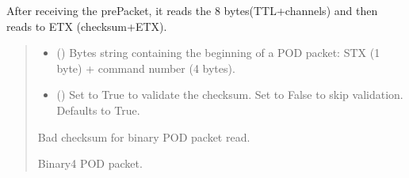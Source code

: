 \documentclass[letterpaper,10pt,english]{sphinxmanual}
\begin{document}
\begin{fulllineitems}
\begin{fulllineitems}
\begin{quote}
\begin{description}
\end{description}\end{quote}

\end{fulllineitems}


\begin{fulllineitems}
\label{\detokenize{Morelia.Devices:Morelia.Devices.PodDevice_8206HR.Pod8206HR._Read_Binary}}
\pysigstartsignatures
{}
\pysigstopsignatures
\sphinxAtStartPar
After receiving the prePacket, it reads the 8 bytes(TTL+channels) and then reads to ETX         (checksum+ETX).
\begin{quote}\begin{description}
\begin{itemize}
\item {} 
\sphinxAtStartPar
{} () \textendash{} Bytes string containing the beginning of a POD packet: STX (1 byte)                 + command number (4 bytes).

\item {} 
\sphinxAtStartPar
{} (\sphinxstyleliteralemphasis{\sphinxupquote{, }}) \textendash{} Set to True to validate the checksum. Set to False to                 skip validation. Defaults to True.

\end{itemize}

\sphinxAtStartPar
{} \textendash{} Bad checksum for binary POD packet read.

\sphinxAtStartPar
Binary4 POD packet.


\end{description}
\end{quote}
\end{fulllineitems}
\end{fulllineitems}
\end{document}

